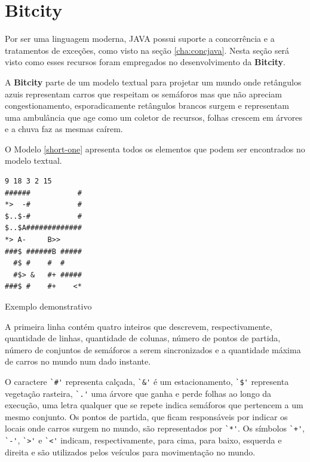 \chapter{Bitcity}

Por ser uma linguagem moderna, JAVA possui suporte a concorrência e a
tratamentos de exceções, como visto na seção \ref{cha:concjava}. Nesta seção
será visto como esses recursos foram empregados no desenvolvimento da
\textbf{Bitcity}.

A \textbf{Bitcity} parte de um modelo textual para projetar um mundo
onde retângulos azuis representam carros que respeitam os semáforos
mas que não apreciam congestionamento, esporadicamente
retângulos brancos surgem e representam uma ambulância que age como um
coletor de recursos, folhas crescem em árvores e a chuva faz as mesmas
caírem.

O Modelo \ref{short-one} apresenta todos os elementos que podem ser
encontrados no modelo textual.

\begin{model}
\begin{verbatim}
9 18 3 2 15
######           #
*>  -#           #
$..$-#           # 
$..$A#############
*> A-     B>>
###$ ######B #####
  #$ #    #  #    
  #$> &   #+ #####
###$ #    #+    <*
\end{verbatim}
  \caption{Exemplo demonstrativo \label{short-one}}
\end{model}

A primeira linha contém quatro inteiros que descrevem, respectivamente,
quantidade de linhas, quantidade de colunas, número de pontos de
partida, número de conjuntos de semáforos a serem sincronizados e a
quantidade máxima de carros no mundo num dado instante.

O caractere \verb!`#'! representa calçada, \verb!`&'! é um
estacionamento, \verb!`$'! representa
vegetação rasteira, \verb!`.'! uma árvore que ganha e perde folhas ao
longo da execução, uma letra qualquer que se repete indica semáforos
que pertencem a um mesmo conjunto. Os pontos de partida, que ficam
responsáveis por indicar os locais onde carros surgem no mundo, são
representados por \verb!`*'!. Os símbolos \verb!`+'!, \verb!`-'!,
\verb!`>'! e \verb!`<'! indicam, respectivamente, para cima, para
baixo, esquerda e direita e são utilizados pelos veículos para
movimentação no mundo.

